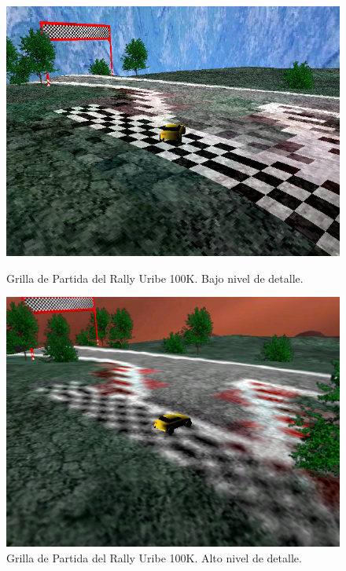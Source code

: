 \documentclass[a4paper,10pt]{article}
\begin{document}
\begin{figure}
\begin{minipage}[b]{0.5\linewidth}
\centering
 \includegraphics[scale=0.250]{./startinggrid.png}
 \caption{Grilla de Partida del Rally Uribe 100K. Bajo nivel de detalle.}
\label{fig:figure1}
\end{minipage}
\hspace{0.5cm}
\begin{minipage}[b]{0.5\linewidth}
\centering
 \includegraphics[scale=0.250]{./startinggrid_high.png}
 \caption{Grilla de Partida del Rally Uribe 100K. Alto nivel de detalle.}
\label{fig:figure2}
\end{minipage}
\end{figure}
\end{document}

